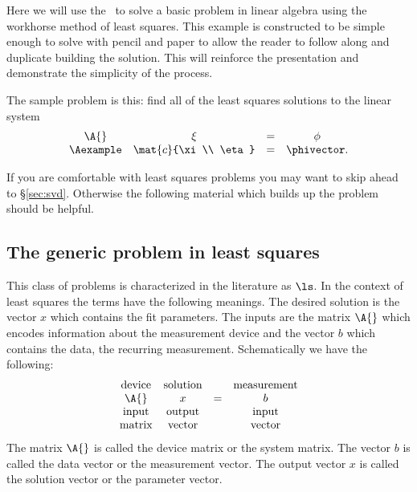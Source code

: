 Here we will use the \svdl \ to solve a basic problem in linear algebra using the workhorse method of least squares. This example is constructed to be simple enough to solve with pencil and paper to allow the reader to follow along and duplicate building the solution. This will reinforce the presentation and demonstrate the simplicity of the process.

The sample problem is this: find all of the least squares solutions to the linear system
\begin{equation}
\begin{array}{cccc}
    \A{} & \xi & = & \phi\\
    \Aexample &
    \mat{c}{\xi\\ \eta}
    & = &
    \phivector.
\end{array}
\label{eq:simple:problem}
\end{equation}

If you are comfortable with least squares problems you may want to skip ahead to \S \eqref{sec:svd}. Otherwise the following material which builds up the problem should be helpful.

\subsection{The generic problem in least squares}
This class of problems is characterized in the literature as $\ls$. In the context of least squares the terms have the following meanings. The desired solution is the vector $x$ which contains the fit parameters. The inputs are the matrix $\A{}$ which encodes information about the measurement device and the vector $b$ which contains the data, the recurring measurement. Schematically we have the following:
\begin{equation}
  \begin{array}{cccc}
  \text{device} & \text{solution} && \text{measurement}\\
  \A{} & x & = & b\\
  \text{input} & \text{output} && \text{input}\\
  \text{matrix} & \text{vector} && \text{vector}\\
  \end{array}
\end{equation}
The matrix $\A{}$ is called the device matrix or the system matrix. The vector $b$ is called the data vector or the measurement vector. The output vector $x$ is called the solution vector or the parameter vector.

